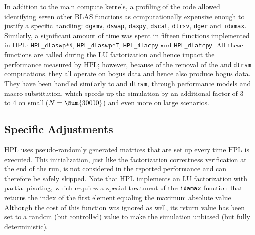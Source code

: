             In addition to the main compute kernels, a profiling of the code allowed identifying seven other BLAS functions
            as computationally expensive enough to justify a specific handling: \texttt{dgemv}, \texttt{dswap},
            \texttt{daxpy}, \texttt{dscal}, \texttt{dtrsv}, \texttt{dger} and \texttt{idamax}. Similarly, a significant
            amount of time was spent in fifteen functions implemented in HPL: \texttt{HPL\_dlaswp*N},
            \texttt{HPL\_dlaswp*T}, \texttt{HPL\_dlacpy} and \texttt{HPL\_dlatcpy}.  All these functions are called during
            the LU factorization and hence impact the performance measured by HPL; however, because of the removal of the
            \dgemm and \texttt{dtrsm} computations, they all operate on bogus data and hence also produce bogus
            data. They have been handled similarly to \dgemm and \texttt{dtrsm}, through performance models and
            macro substitution, which speeds up the simulation by an additional factor of \(3\) to \(4\) on small
            (\(N=\Num{30000}\)) and even more on large scenarios.

        \subsection{Specific Adjustments}
            HPL uses pseudo-randomly generated matrices that are set up every time HPL is executed. This initialization, just
            like the factorization correctness verification at the end of the run, is not considered in the reported
            performance and can therefore be safely skipped.  Note that HPL implements an LU factorization with partial
            pivoting, which requires a special treatment of the \texttt{idamax} function that returns the index of the first
            element equaling the maximum absolute value. Although the cost of this function was ignored as well, its return
            value has been set to a random (but controlled) value to make the simulation unbiased (but fully
            deterministic).


